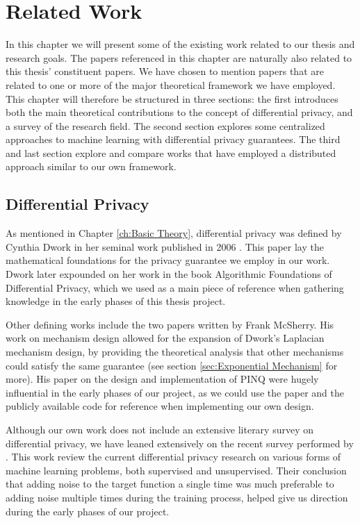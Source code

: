 
\chapter{Related Work} \label{ch:Related Work}

In this chapter we will present some of the existing work related to our thesis and research goals. The papers referenced in this chapter are naturally also related to this thesis' constituent papers. We have chosen to mention papers that are related to one or more of the major theoretical framework we have employed. This chapter will therefore be structured in three sections: the first introduces both the main theoretical contributions to the concept of differential privacy, and a survey of the research field. The second section explores some centralized approaches to machine learning with differential privacy guarantees. The third and last section explore and compare works that have employed a distributed approach similar to our own framework.   

\section{Differential Privacy}
As mentioned in Chapter \ref{ch:Basic Theory}, differential privacy was defined by Cynthia Dwork in her seminal work published in 2006 \citep{Dwork06differentialprivacy}. This paper lay the mathematical foundations for the privacy guarantee we employ in our work. Dwork later expounded on her work in the book Algorithmic Foundations of Differential Privacy\citep{dwork2013algorithmic}, which we used as a main piece of reference when gathering knowledge in the early phases of this thesis project.

Other defining works include the two papers written by Frank McSherry. His work on mechanism design \citep{mcsherry2007} allowed for the expansion of Dwork's Laplacian mechanism design, by providing the theoretical analysis that other mechanisms could satisfy the same guarantee (see section \ref{sec:Exponential Mechanism} for more). His paper \citep{mcsherry2009PINQ} on the design and implementation of PINQ were hugely influential in the early phases of our project, as we could use the paper and the publicly available code for reference when implementing our own design. 

Although our own work does not include an extensive literary survey on differential privacy, we have leaned extensively on the recent survey performed by \cite{ji2014differential}. This work review the current differential privacy research on various forms of machine learning problems, both supervised and unsupervised. Their conclusion that adding noise to the target function a single time was much preferable to adding noise multiple times during the training process, helped give us direction during the early phases of our project.  

